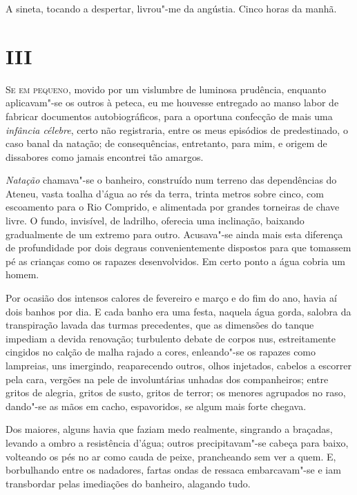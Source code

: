 A sineta, tocando a despertar, livrou"-me
da angústia. Cinco horas da manhã. 

\section{III}

\noindent\textsc{Se em pequeno}, movido por um vislumbre de luminosa prudência, enquanto
aplicavam"-se os outros à peteca, eu me houvesse entregado ao manso
labor de fabricar documentos autobiográficos, para a oportuna confecção
de mais uma \textit{infância célebre}, certo não registraria, entre os meus
episódios de predestinado, o caso banal da natação; de consequências,
entretanto, para mim, e origem de dissabores como jamais encontrei tão amargos.
 
\textit{Natação} chamava"-se o banheiro, construído num terreno das dependências do 
Ateneu, vasta toalha d'água ao rés da terra, trinta metros sobre cinco, 
com escoamento para o Rio Comprido, e alimentada por grandes torneiras de
chave livre. O fundo, invisível, de ladrilho, oferecia uma inclinação,
baixando gradualmente de um extremo para outro. Acusava"-se ainda mais
esta diferença de profundidade por dois degraus convenientemente
dispostos para que tomassem pé as crianças como os rapazes
desenvolvidos. Em certo ponto a água cobria um homem. 


Por ocasião dos
intensos calores de fevereiro e março e do fim do ano, havia aí dois
banhos por dia. E cada banho era uma festa, naquela água gorda, salobra
da transpiração lavada das turmas precedentes, que as dimensões do
tanque impediam a devida renovação; turbulento debate de corpos nus,
estreitamente cingidos no calção de malha rajado a cores, enleando"-se
os rapazes como lampreias, uns imergindo, reaparecendo outros, olhos
injetados, cabelos a escorrer pela cara, vergões na pele de
involuntárias unhadas dos companheiros; entre gritos de alegria, gritos
de susto, gritos de terror; os menores agrupados no raso, dando"-se as
mãos em cacho, espavoridos, se algum mais forte chegava. 


Dos maiores, alguns havia que faziam medo realmente, singrando a braçadas, 
levando a ombro a resistência d'água; outros precipitavam"-se cabeça para baixo,
volteando os pés no ar como cauda de peixe, prancheando sem ver a quem.
E, borbulhando entre os nadadores, fartas ondas de ressaca
embarcavam"-se e iam transbordar pelas imediações do banheiro,
alagando tudo. 

